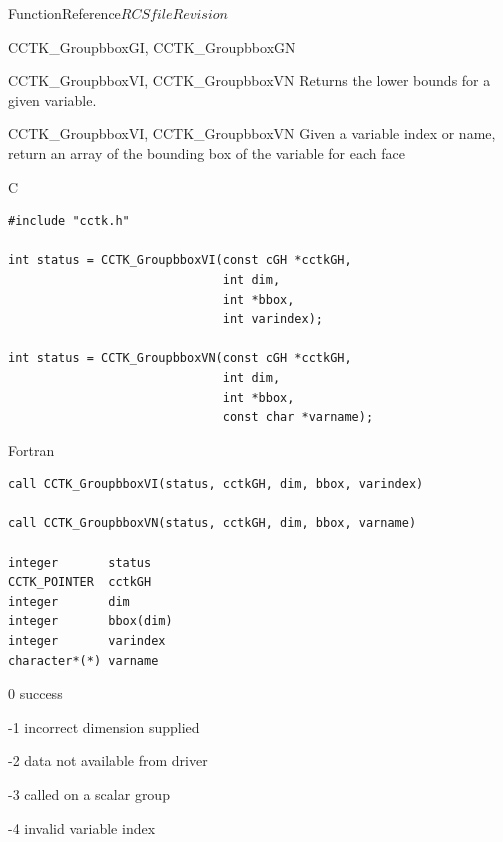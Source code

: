 \begin{cactuspart}{FunctionReference}{$RCSfile$}{$Revision$}
\begin{FunctionDescription}{CCTK\_GroupbboxGI, CCTK\_GroupbboxGN}
\begin{SeeAlsoSection}
\begin{SeeAlso}{CCTK\_GroupbboxVI, CCTK\_GroupbboxVN}
Returns the lower bounds for a given variable.
\end{SeeAlso}
\end{SeeAlsoSection}

\end{FunctionDescription}


\begin{FunctionDescription}{CCTK\_GroupbboxVI, CCTK\_GroupbboxVN}
\label{CCTK-GroupbboxVI}
\label{CCTK-GroupbboxVN}
Given a variable index or name, return an array of the bounding box of the variable for each face

\begin{SynopsisSection}
\begin{Synopsis}{C}
\begin{verbatim}
#include "cctk.h"

int status = CCTK_GroupbboxVI(const cGH *cctkGH,
                              int dim,
                              int *bbox,
                              int varindex);

int status = CCTK_GroupbboxVN(const cGH *cctkGH,
                              int dim,
                              int *bbox,
                              const char *varname);
\end{verbatim}
\end{Synopsis}
\begin{Synopsis}{Fortran}
\begin{verbatim}
call CCTK_GroupbboxVI(status, cctkGH, dim, bbox, varindex)

call CCTK_GroupbboxVN(status, cctkGH, dim, bbox, varname)

integer       status
CCTK_POINTER  cctkGH
integer       dim
integer       bbox(dim)
integer       varindex
character*(*) varname
\end{verbatim}
\end{Synopsis}
\end{SynopsisSection}

\begin{ResultSection}
\begin{Result}{\rm 0} success \end{Result}
\begin{Result}{\rm -1} incorrect dimension supplied \end{Result}
\begin{Result}{\rm -2} data not available from driver \end{Result}
\begin{Result}{\rm -3} called on a scalar group \end{Result}
\begin{Result}{\rm -4} invalid variable index \end{Result}
\end{ResultSection}


\end{FunctionDescription}
\end{cactuspart}
